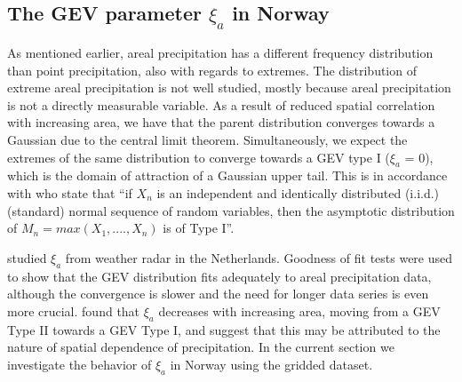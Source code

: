 \documentclass[12pt,a4paper,english]{article}
\begin{document}
\subsection{The GEV parameter $\xi_{a}$ in Norway}

As mentioned earlier, areal precipitation has a different frequency distribution than point precipitation, also with regards to extremes. The distribution of extreme areal precipitation is not well studied, mostly because areal precipitation is not a directly measurable variable. As a result of reduced spatial correlation with increasing area, we have that the parent distribution converges towards a Gaussian due to the central limit theorem. Simultaneously, we expect the extremes of the same distribution to converge towards a GEV type I ($\xi_{a}$ = 0), which is the domain of attraction of a Gaussian upper tail. This is in accordance with \cite{Leadbetteretal1980} who state that ``if $X_{n}$ is an independent and identically distributed (i.i.d.) (standard) normal sequence of random variables, then the asymptotic distribution of $M_{n} = max(X_{1},....,X_{n})$ is of Type I''.

    
\cite{Overeemetal2010} studied $\xi_{a}$ from weather radar in the Netherlands. Goodness of fit tests were used to show that the GEV distribution fits adequately to areal precipitation data, although the convergence is slower and the need for longer data series is even more crucial. \cite{Overeemetal2010} found that $\xi_{a}$ decreases with increasing area, moving from a GEV Type II towards a GEV Type I, and suggest that this may be attributed to the nature of spatial dependence of precipitation. 
In the current section we investigate the behavior of $\xi_{a}$ in Norway using the gridded dataset. 

\end{document}
